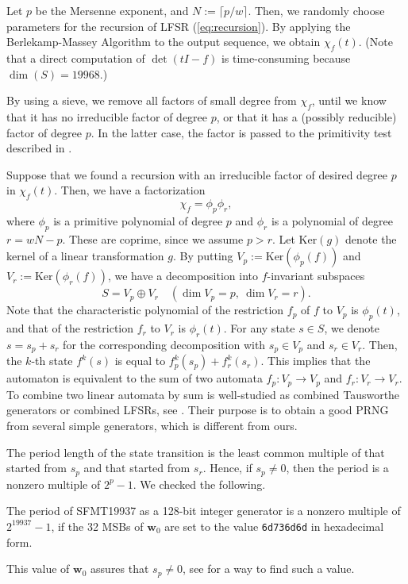 \documentclass{svmult}
\def\bw{{{\mathbf w}}}
\def\ker{{\mathrm{Ker}}}
\begin{document}
Let $p$ be the Mersenne exponent, and $N:=\lceil p/w \rceil$.
Then, we randomly choose parameters for the recursion of LFSR
(\ref{eq:recursion}).
By applying the Berlekamp-Massey Algorithm to 
the output sequence, we obtain 
$\chi_f(t)$.
(Note that a direct computation of $\det(tI-f)$ is time-consuming
 because $\dim(S)=19968$.)

By using a sieve, we remove all 
factors of small degree from $\chi_f$,
until we know that it has no irreducible factor of degree $p$,
or that it has a (possibly reducible) factor of degree $p$. 
In the latter case, the factor is 
passed to the primitivity test described 
in \cite[\S3.2.2]{knuth:bible}.

Suppose that we found a recursion with an irreducible factor of 
desired degree $p$ in $\chi_f(t)$. Then, 
we have a factorization
$$
\chi_f=\phi_p \phi_r,
$$
where $\phi_p$ is a primitive polynomial of degree $p$
and $\phi_r$ is a polynomial of degree $r = wN-p$. These are coprime, 
since we assume $p>r$.
Let $\ker(g)$ denote the kernel of a linear transformation $g$.
By putting $V_p:=\ker \left(\phi_p(f)\right)$ 
and $V_r:=\ker \left(\phi_r(f)\right)$,
we have a decomposition into $f$-invariant subspaces
$$
S=V_p \oplus V_r \quad (\dim V_p=p, \ \dim V_r=r).
$$
Note that the characteristic polynomial of 
the restriction $f_p$ of $f$ to $V_p$ is $\phi_p(t)$, and
that of the restriction $f_r$ to $V_r$ is $\phi_r(t)$. 
For any state $s \in S$, we denote $s=s_p+s_r$ for the corresponding
decomposition with $s_p \in V_p$ and $s_r \in V_r$.
Then, the $k$-th state $f^k(s)$ is equal to
$f_p^k(s_p) + f_r^k(s_r)$. This implies that the automaton 
is equivalent to the sum of two automata $f_p:V_p \to V_p$ and
$f_r: V_r \to V_r$. To combine two linear automata by sum is 
well-studied as combined Tausworthe generators or combined LFSRs, 
see \cite{CLT} \cite{COMBTAUS} \cite{COMBLFSR}.
Their purpose is to obtain a good PRNG from several simple generators,
which is different from ours.

The period length of the state transition is the least common multiple
of that started from $s_p$ and that started from $s_r$. Hence, 
if $s_p \neq 0$, then the period is a nonzero multiple of $2^p-1$. 
We checked the following. 
\begin{proposition}
The period of SFMT19937 as a 128-bit integer generator is 
a nonzero multiple of $2^{19937}-1$, if the 32 MSBs of 
$\bw_0$ are set to 
the value {\tt 6d736d6d} in hexadecimal form.
\end{proposition}
This value of $\bw_0$ assures that $s_p\neq 0$,
see \cite{PMT} for a way to find such a value.
\end{document}
